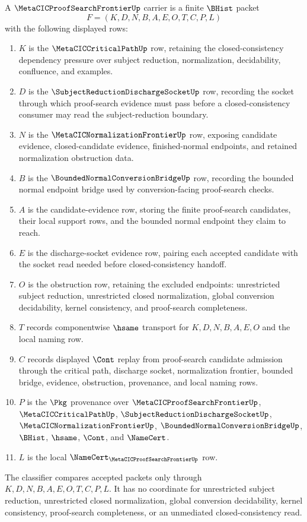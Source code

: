 \begin{definition}
\label{def:metacic-proof-search-frontier-carrier}
A $\MetaCICProofSearchFrontierUp$ carrier is a finite $\BHist$ packet
$$
F=(K,D,N,B,A,E,O,T,C,P,L)
$$
with the following displayed rows:
\begin{enumerate}
\item $K$ is the $\MetaCICCriticalPathUp$ row, retaining the closed-consistency dependency pressure over subject reduction, normalization, decidability, confluence, and examples.
\item $D$ is the $\SubjectReductionDischargeSocketUp$ row, recording the socket through which proof-search evidence must pass before a closed-consistency consumer may read the subject-reduction boundary.
\item $N$ is the $\MetaCICNormalizationFrontierUp$ row, exposing candidate evidence, closed-candidate evidence, finished-normal endpoints, and retained normalization obstruction data.
\item $B$ is the $\BoundedNormalConversionBridgeUp$ row, recording the bounded normal endpoint bridge used by conversion-facing proof-search checks.
\item $A$ is the candidate-evidence row, storing the finite proof-search candidates, their local support rows, and the bounded normal endpoint they claim to reach.
\item $E$ is the discharge-socket evidence row, pairing each accepted candidate with the socket read needed before closed-consistency handoff.
\item $O$ is the obstruction row, retaining the excluded endpoints: unrestricted subject reduction, unrestricted closed normalization, global conversion decidability, kernel consistency, and proof-search completeness.
\item $T$ records componentwise $\hsame$ transport for $K,D,N,B,A,E,O$ and the local naming row.
\item $C$ records displayed $\Cont$ replay from proof-search candidate admission through the critical path, discharge socket, normalization frontier, bounded bridge, evidence, obstruction, provenance, and local naming rows.
\item $P$ is the $\Pkg$ provenance over $\MetaCICProofSearchFrontierUp$, $\MetaCICCriticalPathUp$, $\SubjectReductionDischargeSocketUp$, $\MetaCICNormalizationFrontierUp$, $\BoundedNormalConversionBridgeUp$, $\BHist$, $\hsame$, $\Cont$, and $\NameCert$.
\item $L$ is the local $\NameCert_{\MetaCICProofSearchFrontierUp}$ row.
\end{enumerate}
The classifier compares accepted packets only through $K,D,N,B,A,E,O,T,C,P,L$. It has no coordinate for unrestricted subject reduction, unrestricted closed normalization, global conversion decidability, kernel consistency, proof-search completeness, or an unmediated closed-consistency read.
\end{definition}

